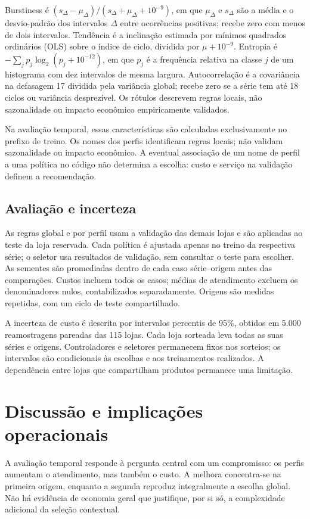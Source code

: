 \documentclass[preprint,12pt]{elsarticle}
\begin{document}
Burstiness é $(s_\Delta-\mu_\Delta)/(s_\Delta+\mu_\Delta+10^{-9})$, em que $\mu_\Delta$ e $s_\Delta$ são a média e o desvio-padrão dos intervalos $\Delta$ entre ocorrências positivas; recebe zero com menos de dois intervalos. Tendência é a inclinação estimada por mínimos quadrados ordinários (OLS) sobre o índice de ciclo, dividida por $\mu+10^{-9}$. Entropia é $-\sum_j p_j\log_2(p_j+10^{-12})$, em que $p_j$ é a frequência relativa na classe $j$ de um histograma com dez intervalos de mesma largura. Autocorrelação é a covariância na defasagem 17 dividida pela variância global; recebe zero se a série tem até 18 ciclos ou variância desprezível. Os rótulos descrevem regras locais, não sazonalidade ou impacto econômico empiricamente validados.

Na avaliação temporal, essas características são calculadas exclusivamente no prefixo de treino. Os nomes dos perfis identificam regras locais; não validam sazonalidade ou impacto econômico. A eventual associação de um nome de perfil a uma política no código não determina a escolha: custo e serviço na validação definem a recomendação.

\subsection{Avaliação e incerteza}
As regras global e por perfil usam a validação das demais lojas e são aplicadas ao teste da loja reservada. Cada política é ajustada apenas no treino da respectiva série; o seletor usa resultados de validação, sem consultar o teste para escolher. As sementes são promediadas dentro de cada caso série--origem antes das comparações. Custos incluem todos os casos; médias de atendimento excluem os denominadores nulos, contabilizados separadamente. Origens são medidas repetidas, com um ciclo de teste compartilhado.

A incerteza de custo é descrita por intervalos percentis de 95\%, obtidos em 5.000 reamostragens pareadas das 115 lojas. Cada loja sorteada leva todas as suas séries e origens. Controladores e seletores permanecem fixos nos sorteios; os intervalos são condicionais às escolhas e aos treinamentos realizados. A dependência entre lojas que compartilham produtos permanece uma limitação.



\section{Discussão e implicações operacionais}
A avaliação temporal responde à pergunta central com um compromisso: os perfis aumentam o atendimento, mas também o custo. A melhora concentra-se na primeira origem, enquanto a segunda reproduz integralmente a escolha global. Não há evidência de economia geral que justifique, por si só, a complexidade adicional da seleção contextual.
\end{document}

